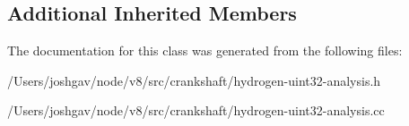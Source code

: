\subsection*{Additional Inherited Members}


The documentation for this class was generated from the following files\+:\begin{DoxyCompactItemize}
\item 
/\+Users/joshgav/node/v8/src/crankshaft/hydrogen-\/uint32-\/analysis.\+h\item 
/\+Users/joshgav/node/v8/src/crankshaft/hydrogen-\/uint32-\/analysis.\+cc\end{DoxyCompactItemize}
